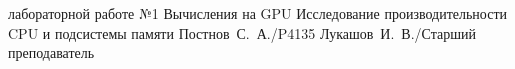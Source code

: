\documentclass{itmo}
\begin{document}
\makereporttitle{}
	{лабораторной работе №1}
	{Вычисления на GPU}
	{Исследование производительности CPU и подсистемы памяти}
	{}
	{Постнов~С.~А./P4135}
	{Лукашов~И.~В./Старший преподаватель}

\maketableofcontents











\end{document}
